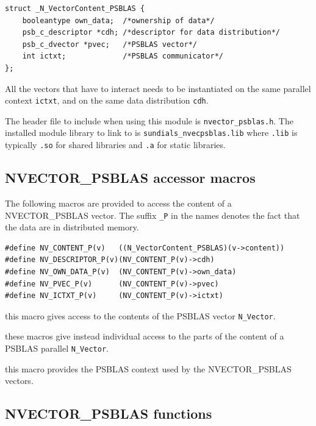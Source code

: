 \documentclass[twoside,a4paper]{refart}
\theoremstyle{definition}
\begin{document}
\begin{lstlisting}[style=CStyle]
struct _N_VectorContent_PSBLAS {
	booleantype own_data;  /*ownership of data*/
	psb_c_descriptor *cdh; /*descriptor for data distribution*/
	psb_c_dvector *pvec;   /*PSBLAS vector*/
	int ictxt;             /*PSBLAS communicator*/
};
\end{lstlisting}
	
	\attention All the vectors that have to interact needs to be instantiated on the same parallel context \lstinline[style=CStyle]|ictxt|, and on the same data distribution \lstinline[style=CStyle]|cdh|.
	
	
	The header file to include when using this module is \texttt{nvector\_psblas.h}. The installed module library to link to is \texttt{sundials\_nvecpsblas.lib} where \texttt{.lib} is typically \texttt{.so} for shared libraries and \texttt{.a} for static libraries.
	
	\subsection{NVECTOR\_PSBLAS accessor macros}
	
	The following macros are provided to access the content of a NVECTOR\_PSBLAS vector. The suffix \texttt{\_P} in the names denotes the fact that the data are in distributed memory.

\begin{lstlisting}[style=CStyle]
#define NV_CONTENT_P(v)   ((N_VectorContent_PSBLAS)(v->content))
#define NV_DESCRIPTOR_P(v)(NV_CONTENT_P(v)->cdh)
#define NV_OWN_DATA_P(v)  (NV_CONTENT_P(v)->own_data)
#define NV_PVEC_P(v)      (NV_CONTENT_P(v)->pvec)
#define NV_ICTXT_P(v)     (NV_CONTENT_P(v)->ictxt)
\end{lstlisting}

 this macro gives access to the contents of the PSBLAS vector \texttt{N\_Vector}.

 these macros give instead individual access to the parts of the content of a PSBLAS parallel \texttt{N\_Vector}.

 this macro provides the PSBLAS context used by the NVECTOR\_PSBLAS vectors.

\subsection{NVECTOR\_PSBLAS functions}
\end{document}
